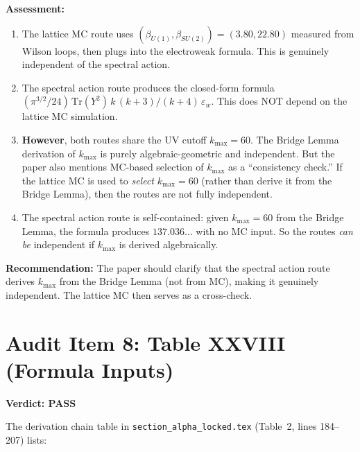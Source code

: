 \documentclass[11pt]{article}
\newcommand{\PASS}{\textcolor{pass}{\textbf{PASS}}}
\begin{document}
\textbf{Assessment:}
\begin{enumerate}
\item The lattice MC route uses $(\beta_{U(1)}, \beta_{SU(2)}) = (3.80, 22.80)$
  measured from Wilson loops, then plugs into the electroweak formula.
  This is genuinely independent of the spectral action.

\item The spectral action route produces the closed-form formula
  $(\pi^{3/2}/24)\,\mathrm{Tr}(Y^2)\,k\,(k+3)/(k+4)\,\varepsilon_w$.
  This does NOT depend on the lattice MC simulation.

\item \textbf{However}, both routes share the UV cutoff $k_{\max} = 60$.
  The Bridge Lemma derivation of $k_{\max}$ is purely algebraic-geometric
  and independent. But the paper also mentions MC-based selection of $k_{\max}$
  as a ``consistency check.'' If the lattice MC is used to \emph{select}
  $k_{\max} = 60$ (rather than derive it from the Bridge Lemma), then
  the routes are not fully independent.

\item The spectral action route is self-contained: given $k_{\max} = 60$
  from the Bridge Lemma, the formula produces $137.036\ldots$ with no
  MC input. So the routes \emph{can be} independent if $k_{\max}$ is
  derived algebraically.
\end{enumerate}

\textbf{Recommendation:} The paper should clarify that the spectral action
route derives $k_{\max}$ from the Bridge Lemma (not from MC), making it
genuinely independent. The lattice MC then serves as a cross-check.

\section{Audit Item 8: Table XXVIII (Formula Inputs)}

\textbf{Verdict: \PASS}

\medskip
The derivation chain table in \texttt{section\_alpha\_locked.tex} (Table~2,
lines 184--207) lists:
\end{document}
